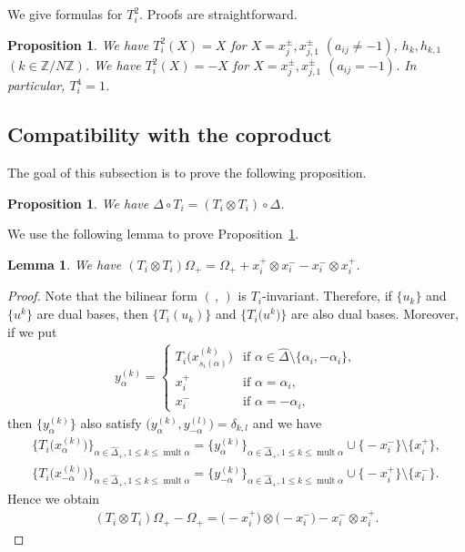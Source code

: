 \documentclass[10pt,a4paper]{amsart}
\newtheorem{prop}[thm]{Proposition}
\newtheorem{lem}[thm]{Lemma}
\theoremstyle{definition}
\numberwithin{equation}{section}
\DeclareMathOperator{\mult}{mult}
\newcommand{\bbZ}{\mathbb{Z}}
\begin{document}
We give formulas for $T_i^2$. Proofs are straightforward.
\begin{prop} We have $T_i^2(X)=X$ for $X=x_{j}^{\pm}, x_{j,1}^{\pm}$ $(a_{ij} \neq -1)$, $h_k, h_{k,1}$ $(k \in \bbZ/N\bbZ)$. We have $T_i^2(X)=-X$ for $X=x_{j}^{\pm}, x_{j,1}^{\pm}$ $(a_{ij} = -1)$. In particular, $T_i^4 = 1$.
\end{prop}

\subsection{Compatibility with the coproduct}\label{subsec:compatibility_coproduct}

The goal of this subsection is to prove the following proposition.
\begin{prop}\label{prop:compatibility_coproduct}We have $\Delta \circ T_i = (T_i \otimes T_i) \circ \Delta$.
\end{prop}

We use the following lemma to prove Proposition~\ref{prop:compatibility_coproduct}.

\begin{lem}\label{lem:Omega}We have $(T_i \otimes T_i)\Omega_+ = \Omega_+ + x_i^+ \otimes x_i^- - x_i^- \otimes x_i^+$.
\end{lem}
\begin{proof}Note that the bilinear form $(\, ,\, )$ is $T_i$-invariant. Therefore, if $\{u_k\}$ and $\big\{u^k\big\}$ are dual bases, then $\{T_i(u_k)\}$ and $\big\{T_i\big(u^k\big)\big\}$ are also dual bases. Moreover, if we put
\begin{gather*}
y_{\alpha}^{(k)} = \begin{cases}
T_i\big(x_{s_i(\alpha)}^{(k)}\big) & \text{if $\alpha \in \hat{\Delta} \setminus \{\alpha_i, -\alpha_i\}$},\\
x_i^+ & \text{if $\alpha = \alpha_i$},\\
x_i^- & \text{if $\alpha = -\alpha_i$},
\end{cases}
\end{gather*}
then $\big\{ y_{\alpha}^{(k)} \big\}$ also satisfy $\big(y_{\alpha}^{(k)}, y_{-\alpha}^{(l)}\big) = \delta_{k,l}$ and we have
\begin{gather*}
\big\{ T_i \big(x_{\alpha}^{(k)}\big) \big\}_{\alpha \in \hat{\Delta}_+, 1 \leq k \leq \mult \alpha} = \big\{y_\alpha^{(k)}\big\}_{\alpha \in \hat{\Delta}_+, 1 \leq k \leq \mult \alpha} \cup \big\{{-}x_i^-\big\} \setminus \big\{x_i^+\big\},\\
\big\{ T_i \big(x_{-\alpha}^{(k)}\big) \big\}_{\alpha \in \hat{\Delta}_+, 1 \leq k \leq \mult \alpha} = \big\{y_{-\alpha}^{(k)}\big\}_{\alpha \in \hat{\Delta}_+, 1 \leq k \leq \mult \alpha} \cup \big\{{-}x_i^+\big\} \setminus \big\{x_i^-\big\}.
\end{gather*}
Hence we obtain
\begin{gather*}
(T_i \otimes T_i)\Omega_+ - \Omega_+ = \big({-}x_i^+\big) \otimes \big({-}x_i^-\big) - x_i^- \otimes x_i^+.\tag*{\qed}
\end{gather*}\renewcommand{\qed}{}
\end{proof}
\end{document}
